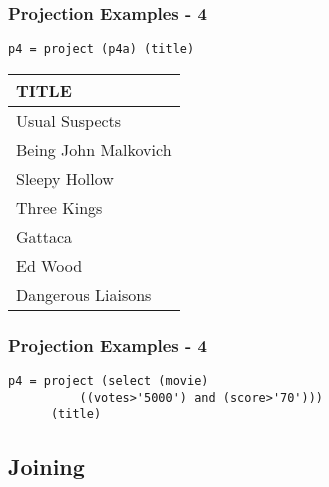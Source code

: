 \documentclass[dvipsnames]{beamer}
\theoremstyle{plain}
\begin{document}
\begin{frame}[fragile]
  \frametitle{Projection Examples - 4}

  \begin{example}
    \begin{lstlisting}
p4 = project (p4a) (title)
    \end{lstlisting}

    \pause
    \begin{tiny}
    \begin{table}
      \begin{tabular}{|l|}\hline
TITLE               \\\hline\hline
Usual Suspects      \\\hline
Being John Malkovich\\\hline
Sleepy Hollow       \\\hline
Three Kings         \\\hline
Gattaca             \\\hline
Ed Wood             \\\hline
Dangerous Liaisons  \\\hline
      \end{tabular}
    \end{table}
    \end{tiny}
  \end{example}
\end{frame}

\begin{frame}[fragile]
  \frametitle{Projection Examples - 4}

  \begin{example}
    \begin{lstlisting}
p4 = project (select (movie)
          ((votes>'5000') and (score>'70')))
      (title)
    \end{lstlisting}
  \end{example}
\end{frame}

\subsection{Joining}
\end{document}
